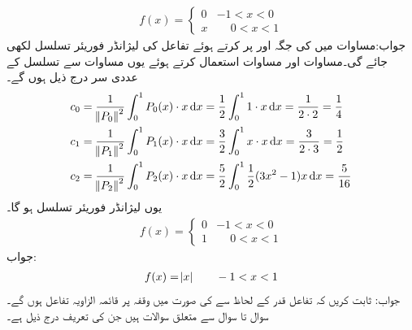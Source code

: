\begin{align*}
f(x)=
\begin{cases}
0 & -1<x<0\\
x& \phantom{-}0<x<1
\end{cases}
\end{align*}
جواب:مساوات  میں  کی جگہ  اور  پر کرتے ہوئے تفاعل  کی لیژانڈر فوریئر تسلسل  لکھی جائے گی۔مساوات  اور مساوات  استعمال کرتے ہوئے  یوں مساوات  سے تسلسل کے عددی سر درج ذیل ہوں گے۔
\begin{align*}
c_0&=\frac{1}{\norm{P_0}^2}\int_{0}^{1} P_0(x) \cdot x \dif x=\frac{1}{2}\int_{0}^{1} 1 \cdot x \dif x=\frac{1}{2\cdot 2}=\frac{1}{4}\\
c_1&=\frac{1}{\norm{P_1}^2}\int_0^1 P_1(x)\cdot x \dif x=\frac{3}{2}\int_0^1 x\cdot x \dif x=\frac{3}{2\cdot 3}=\frac{1}{2}\\
c_2&=\frac{1}{\norm{P_2}^2}\int_0^1 P_2(x)\cdot x \dif x=\frac{5}{2}\int_0^1 \frac{1}{2}(3x^2-1)x\dif x=\frac{5}{16}
\end{align*}
یوں لیژانڈر فوریئر تسلسل  ہو گا۔
\quad
\begin{align*}
f(x)=
\begin{cases}
0& -1<x<0\\
1&\phantom{-}0<x<1
\end{cases}
\end{align*}
جواب:
\begin{align*}
f(x)=\abs{x} \quad\quad  -1<x<1
\end{align*}
جواب:
ثابت کریں کہ تفاعل قدر  کے لحاظ سے   کی صورت میں  وقفہ  پر  قائمہ الزاویہ  تفاعل ہوں گے۔
سوال  تا سوال    سے متعلق سوالات ہیں جن کی تعریف درج ذیل ہے۔
